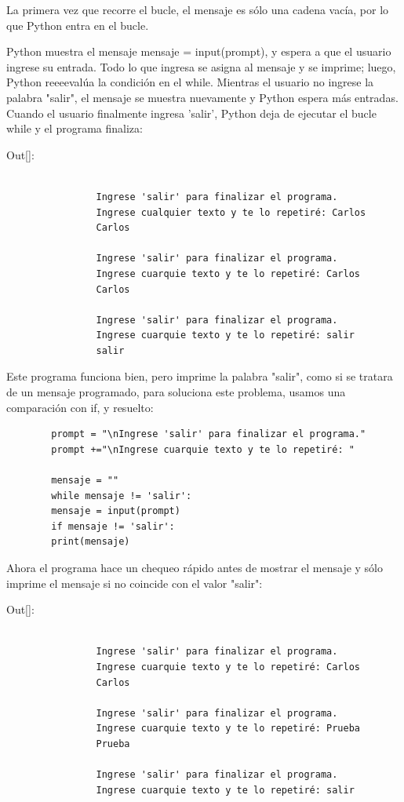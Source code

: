 	La primera vez que recorre el bucle, el mensaje es sólo una cadena vacía, por lo que Python
	entra en el bucle. 
	
	Python muestra el mensaje {\ttfamily mensaje = input(prompt)}, y espera a que el usuario ingrese su entrada. Todo lo que 
	ingresa se asigna al mensaje y se imprime; luego, Python reeeevalúa la condición en el {\ttfamily while}. 
	Mientras el usuario no  ingrese la palabra "salir", el mensaje se muestra nuevamente y Python espera más entradas. 
	Cuando el usuario finalmente ingresa 'salir', Python deja de ejecutar el bucle {\ttfamily while} y el programa finaliza:
	
	
	{\ttfamily\scriptsize\scriptsize \noindent Out[]: \vspace{-0.3cm}	
		{\color{blue} 	
			\begin{verbatim}
				
				Ingrese 'salir' para finalizar el programa.
				Ingrese cualquier texto y te lo repetiré: Carlos
				Carlos
				
				Ingrese 'salir' para finalizar el programa.
				Ingrese cuarquie texto y te lo repetiré: Carlos
				Carlos
				
				Ingrese 'salir' para finalizar el programa.
				Ingrese cuarquie texto y te lo repetiré: salir
				salir	
			\end{verbatim}
	}}
	
	
	Este programa funciona bien, pero imprime la palabra "salir",  como si se tratara de un mensaje programado, para soluciona este problema, usamos una comparación con {\ttfamily if}, y resuelto:
	
	\hspace{-2.2cm}{\ttfamily \scriptsize activo.py} \vspace{-0.55cm}
	\begin{lstlisting}		
		prompt = "\nIngrese 'salir' para finalizar el programa."
		prompt +="\nIngrese cuarquie texto y te lo repetiré: "
		
		mensaje = ""
		while mensaje != 'salir':
		mensaje = input(prompt)
		if mensaje != 'salir':
		print(mensaje)
	\end{lstlisting}	
	
	
	Ahora el programa hace un chequeo rápido antes de mostrar el mensaje y sólo imprime el mensaje si no coincide con el valor "salir":
	
	{\ttfamily\scriptsize\scriptsize \noindent Out[]:\vspace{-0.3cm}	
		{\color{blue} 	
			\begin{verbatim}
				
				Ingrese 'salir' para finalizar el programa.
				Ingrese cuarquie texto y te lo repetiré: Carlos
				Carlos
				
				Ingrese 'salir' para finalizar el programa.
				Ingrese cuarquie texto y te lo repetiré: Prueba
				Prueba
				
				Ingrese 'salir' para finalizar el programa.
				Ingrese cuarquie texto y te lo repetiré: salir			
			\end{verbatim}
	}}
	
